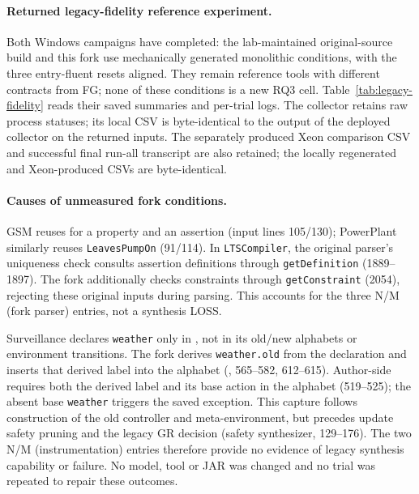 \documentclass[11pt]{article}
\begin{document}
\paragraph{Returned legacy-fidelity reference experiment.}
Both Windows campaigns have completed: the lab-maintained original-source build and this fork use mechanically generated monolithic conditions, with the three entry-fluent resets aligned. They remain reference tools with different contracts from FG; none of these conditions is a new RQ3 cell. Table~\ref{tab:legacy-fidelity} reads their saved summaries and per-trial logs. The collector retains raw process statuses; its local CSV is byte-identical to the output of the deployed collector on the returned inputs. The separately produced Xeon comparison CSV and successful final run-all transcript are also retained; the locally regenerated and Xeon-produced CSVs are byte-identical.



\paragraph{Causes of unmeasured fork conditions.}
GSM reuses  for a property and an assertion (input lines 105/130); PowerPlant similarly reuses \texttt{LeavesPumpOn} (91/114). In \texttt{LTSCompiler}, the original parser's uniqueness check consults assertion definitions through \texttt{getDefinition} (1889--1897). The fork additionally checks constraints through \texttt{getConstraint} (2054), rejecting these original inputs during parsing. This accounts for the three N/M (fork parser) entries, not a synthesis LOSS.

Surveillance declares \texttt{weather} only in , not in its old/new alphabets or environment transitions. The fork derives \texttt{weather.old} from the declaration and inserts that derived label into the alphabet (, 565--582, 612--615). Author-side  requires both the derived label and its base action in the alphabet (519--525); the absent base \texttt{weather} triggers the saved exception. This capture follows construction of the old controller and meta-environment, but precedes update safety pruning and the legacy GR decision (safety synthesizer, 129--176). The two N/M (instrumentation) entries therefore provide no evidence of legacy synthesis capability or failure. No model, tool or JAR was changed and no trial was repeated to repair these outcomes.
\end{document}
